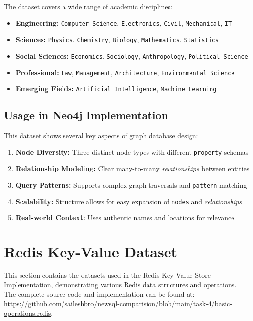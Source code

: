 The dataset covers a wide range of academic disciplines:
\begin{itemize}
    \item \textbf{Engineering:} \texttt{Computer Science}, \texttt{Electronics}, \texttt{Civil}, \texttt{Mechanical}, \texttt{IT}
    \item \textbf{Sciences:} \texttt{Physics}, \texttt{Chemistry}, \texttt{Biology}, \texttt{Mathematics}, \texttt{Statistics}
    \item \textbf{Social Sciences:} \texttt{Economics}, \texttt{Sociology}, \texttt{Anthropology}, \texttt{Political Science}
    \item \textbf{Professional:} \texttt{Law}, \texttt{Management}, \texttt{Architecture}, \texttt{Environmental Science}
    \item \textbf{Emerging Fields:} \texttt{Artificial Intelligence}, \texttt{Machine Learning}
\end{itemize}

\subsection{Usage in Neo4j Implementation}

This dataset shows several key aspects of graph database design:

\begin{enumerate}
    \item \textbf{Node Diversity:} Three distinct node types with different \texttt{property} schemas
    \item \textbf{Relationship Modeling:} Clear many-to-many \textit{relationships} between entities
    \item \textbf{Query Patterns:} Supports complex graph traversals and \texttt{pattern} matching
    \item \textbf{Scalability:} Structure allows for easy expansion of \texttt{nodes} and \textit{relationships}
    \item \textbf{Real-world Context:} Uses authentic names and locations for relevance
\end{enumerate}

\section{Redis Key-Value Dataset}

This section contains the datasets used in the Redis Key-Value Store Implementation, demonstrating various Redis data structures and operations. The complete source code and implementation can be found at: \url{https://github.com/saileshbro/newsql-comparision/blob/main/task-4/basic-operations.redis}.

